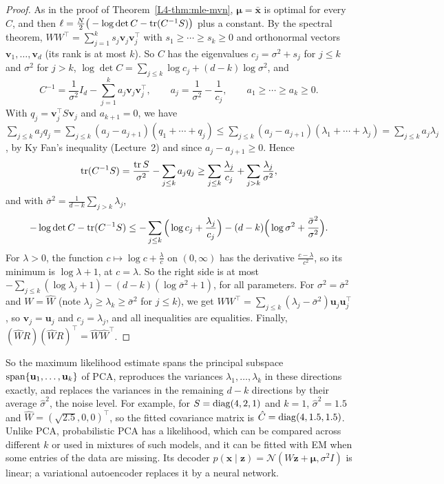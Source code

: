 \begin{proof}
    As in the proof of Theorem~\ref{L4-thm:mle-mvn}, $\boldsymbol{\mu} = \bar{\mathbf{x}}$ is optimal for every $C$, and then $\ell = \frac{N}{2}\big(-\log\det C - \operatorname{tr}(C^{-1}S)\big)$ plus a constant. By the spectral theorem, $WW^\top = \sum_{j=1}^k s_j\mathbf{v}_j\mathbf{v}_j^\top$ with $s_1 \geq \cdots \geq s_k \geq 0$ and orthonormal vectors $\mathbf{v}_1, \ldots, \mathbf{v}_d$ (its rank is at most $k$). So $C$ has the eigenvalues $c_j = \sigma^2 + s_j$ for $j \leq k$ and $\sigma^2$ for $j > k$, $\log\det C = \sum_{j \leq k}\log c_j + (d - k)\log\sigma^2$, and
    \[C^{-1} = \frac{1}{\sigma^2}I_d - \sum_{j=1}^k a_j\mathbf{v}_j\mathbf{v}_j^\top, \qquad a_j = \frac{1}{\sigma^2} - \frac{1}{c_j}, \qquad a_1 \geq \cdots \geq a_k \geq 0.\]
    With $q_j = \mathbf{v}_j^\top S\mathbf{v}_j$ and $a_{k+1} = 0$, we have $\sum_{j \leq k} a_jq_j = \sum_{j \leq k}(a_j - a_{j+1})(q_1 + \cdots + q_j) \leq \sum_{j \leq k}(a_j - a_{j+1})(\lambda_1 + \cdots + \lambda_j) = \sum_{j \leq k} a_j\lambda_j$, by Ky Fan's inequality (Lecture~2) and since $a_j - a_{j+1} \geq 0$. Hence
    \[\operatorname{tr}(C^{-1}S) = \frac{\operatorname{tr} S}{\sigma^2} - \sum_{j \leq k} a_jq_j \geq \sum_{j \leq k}\frac{\lambda_j}{c_j} + \sum_{j > k}\frac{\lambda_j}{\sigma^2},\]
    and with $\bar\sigma^2 = \frac{1}{d - k}\sum_{j > k}\lambda_j$,
    \[-\log\det C - \operatorname{tr}(C^{-1}S) \leq -\sum_{j \leq k}\Big(\log c_j + \frac{\lambda_j}{c_j}\Big) - (d - k)\Big(\log\sigma^2 + \frac{\bar\sigma^2}{\sigma^2}\Big).\]
    For $\lambda > 0$, the function $c \mapsto \log c + \frac{\lambda}{c}$ on $(0, \infty)$ has the derivative $\frac{c - \lambda}{c^2}$, so its minimum is $\log\lambda + 1$, at $c = \lambda$. So the right side is at most $-\sum_{j \leq k}(\log\lambda_j + 1) - (d - k)(\log\bar\sigma^2 + 1)$, for all parameters. For $\sigma^2 = \bar\sigma^2$ and $W = \hat W$ (note $\lambda_j \geq \lambda_k \geq \bar\sigma^2$ for $j \leq k$), we get $WW^\top = \sum_{j \leq k}(\lambda_j - \bar\sigma^2)\mathbf{u}_j\mathbf{u}_j^\top$, so $\mathbf{v}_j = \mathbf{u}_j$ and $c_j = \lambda_j$, and all inequalities are equalities. Finally, $(\hat WR)(\hat WR)^\top = \hat W\hat W^\top$.
\end{proof}

So the maximum likelihood estimate spans the principal subspace $\operatorname{span}\{\mathbf{u}_1, \ldots, \mathbf{u}_k\}$ of PCA, reproduces the variances $\lambda_1, \ldots, \lambda_k$ in these directions exactly, and replaces the variances in the remaining $d - k$ directions by their average $\hat\sigma^2$, the noise level. For example, for $S = \operatorname{diag}(4, 2, 1)$ and $k = 1$, $\hat\sigma^2 = 1.5$ and $\hat W = (\sqrt{2.5}, 0, 0)^\top$, so the fitted covariance matrix is $\hat C = \operatorname{diag}(4, 1.5, 1.5)$. Unlike PCA, probabilistic PCA has a likelihood, which can be compared across different $k$ or used in mixtures of such models, and it can be fitted with EM when some entries of the data are missing. Its decoder $p(\mathbf{x} \mid \mathbf{z}) = \mathcal{N}(W\mathbf{z} + \boldsymbol{\mu}, \sigma^2I)$ is linear; a variational autoencoder replaces it by a neural network.

